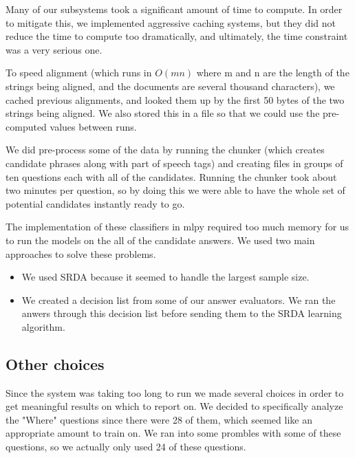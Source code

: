 \documentclass{article}
\begin{document}
Many of our subsystems took a significant amount of time to compute.  In order
to mitigate this, we implemented aggressive caching systems, but they did not
reduce the time to compute too dramatically, and ultimately, the time constraint
was a very serious one.

To speed alignment (which runs in $O(mn)$ where m and n are the length of the strings being aligned, and the documents are several thousand characters), we cached previous alignments, and looked them up by the first 50 bytes of the two strings being aligned.  We also stored this in a file so that we could use the pre-computed values between runs.

We did pre-process some of the data by running the chunker (which creates
candidate phrases along with part of speech tags) and creating files in
groups of ten questions each with all of the candidates. Running the chunker
took about two minutes per question, so by doing this we were able to have
the whole set of potential candidates instantly ready to go.

The implementation of these classifiers in mlpy required too much memory for
us to run the models on the all of the candidate answers. We used two main approaches
to solve these problems.
\begin{itemize}
\item We used SRDA because it seemed to handle the largest sample size.
\item We created a decision list from some of our answer evaluators. We ran the anwers
through this decision list before sending them to the SRDA learning algorithm.
\end{itemize}

\subsection{Other choices}
Since the system was taking too long to run we made several choices in order
to get meaningful results on which to report on. We decided to specifically analyze
the "Where" questions since there were 28 of them, which seemed like an appropriate
amount to train on. We ran into some prombles with some of these questions, so we
actually only used 24 of these questions. 
\end{document}

